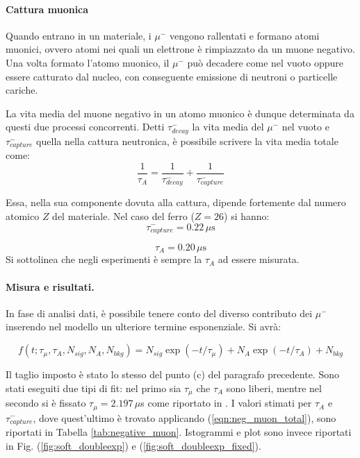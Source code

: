 \documentclass{standalone}
\begin{document}
\paragraph{Cattura muonica}
Quando entrano in un materiale, i $\mu^{-}$ vengono rallentati e formano atomi muonici, ovvero atomi nei quali un elettrone \`e rimpiazzato da un muone negativo. Una volta formato l'atomo muonico, il $\mu^{-}$ pu\`o decadere come nel vuoto oppure essere catturato dal nucleo, con conseguente emissione di neutroni o particelle cariche.

La vita media del muone negativo in un atomo muonico \`e dunque determinata da questi due processi concorrenti. Detti $\tau^{-}_{decay}$ la vita media del $\mu^{-}$ nel vuoto e $\tau^{-}_{capture}$ quella nella cattura neutronica, \`e possibile scrivere la vita media totale come:
\begin{equation}
  \frac{1}{\tau_{A}} = \frac{1}{\tau^{-}_{decay}} + \frac{1}{\tau^{-}_{capture}}
  \label{eqn:neg_muon_total}
\end{equation}

Essa, nella sua componente dovuta alla cattura, dipende fortemente dal numero atomico $Z$ del materiale. Nel caso del ferro ($Z=26$) si hanno:
\begin{equation}
  \tau^{-}_{capture}=0.22\, \mu\text{s}
  \label{eqn:tau_cap_iron}
\end{equation}

\begin{equation}
  \tau_{A}=0.20\, \mu\text{s}
  \label{eqn:tau_tot_iron}
\end{equation}
Si sottolinea che negli esperimenti \`e sempre la $\tau_{A}$ ad essere misurata.

\paragraph{Misura e risultati.}
In fase di analisi dati, \`e possibile tenere conto del diverso contributo dei $\mu^{-}$ inserendo nel modello un ulteriore termine esponenziale. Si avr\`a:

\begin{equation}
  f(t;\tau_{\mu},\tau_{A},N_{sig},N_{A},N_{bkg}) = N_{sig}\exp{(-t/\tau_{\mu})} + N_{A}\exp{(-t/\tau_{A})} + N_{bkg}
  \label{eqn:complex_expo}
\end{equation}

Il taglio imposto \`e stato lo stesso del punto (c) del paragrafo precedente. Sono stati eseguiti due tipi di fit: nel primo sia $\tau_{\mu}$ che $\tau_{A}$ sono liberi, mentre nel secondo si \`e fissato $\tau_{\mu}=2.197\, \mu$s come riportato in \cite{pdg}. I valori stimati per $\tau_{A}$ e $\tau^{-}_{capture}$, dove quest'ultimo \`e trovato applicando (\ref{eqn:neg_muon_total}), sono riportati in Tabella \ref{tab:negative_muon}. Istogrammi e plot sono invece riportati in Fig. (\ref{fig:soft_doubleexp}) e (\ref{fig:soft_doubleexp_fixed}).
\end{document}
